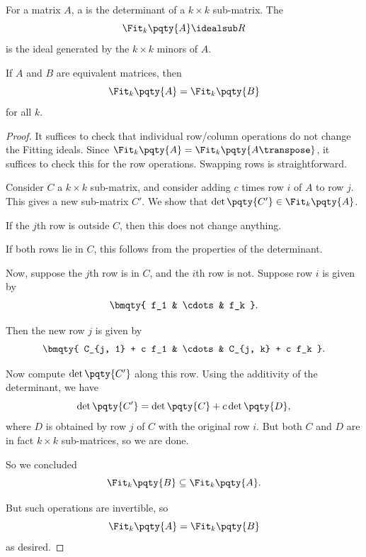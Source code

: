 \begin{definition}
    \label{def:minor-fit-ideals}%
    For a matrix \(A\), a  is the determinant of a \(k \times k\) sub-matrix. The 
    \[
        \Fit_k \pqty{A} \idealsub R
    \]
    is the ideal generated by the \(k \times k\) minors of \(A\).
\end{definition}

\begin{proposition}
    \label{prop:row-column-operations-preserve-fit}%
    If \(A\) and \(B\) are equivalent matrices, then
    \[
        \Fit_k \pqty{A} = \Fit_k \pqty{B}
    \]
    for all \(k\).
\end{proposition}

\begin{proof}
    It suffices to check that individual row/column operations do not change the Fitting ideals. Since \(\Fit_k\pqty{A} = \Fit_k\pqty{A\transpose}\), it suffices to check this for the row operations. Swapping rows is straightforward.

    Consider \(C\) a \(k \times k\) sub-matrix, and consider adding \(c\) times row \(i\) of \(A\) to row \(j\). This gives a new sub-matrix \(C'\). We show that \(\det\pqty{C'} \in \Fit_k\pqty{A}\).

    If the \(j\)th row is outside \(C\), then this does not change anything.

    If both rows lie in \(C\), this follows from the properties of the determinant.

    Now, suppose the \(j\)th row is in \(C\), and the \(i\)th row is not. Suppose row \(i\) is given by
    \[
        \bmqty{
            f_1 & \cdots & f_k
        }.
    \]

    Then the new row \(j\) is given by
    \[
        \bmqty{
            C_{j, 1} + c f_1 & \cdots & C_{j, k} + c f_k
        }.
    \]

    Now compute \(\det \pqty{C'}\) along this row. Using the additivity of the determinant, we have
    \[
        \det\pqty{C'} = \det\pqty{C} + c \det\pqty{D},
    \]
    where \(D\) is obtained by row \(j\) of \(C\) with the original row \(i\). But both \(C\) and \(D\) are in fact \(k \times k\) sub-matrices, so we are done.

    So we concluded
    \[
        \Fit_k \pqty{B} \subseteq \Fit_k \pqty{A}.
    \]

    But such operations are invertible, so
    \[
        \Fit_k \pqty{A} = \Fit_k \pqty{B}
    \]
    as desired.
\end{proof}

